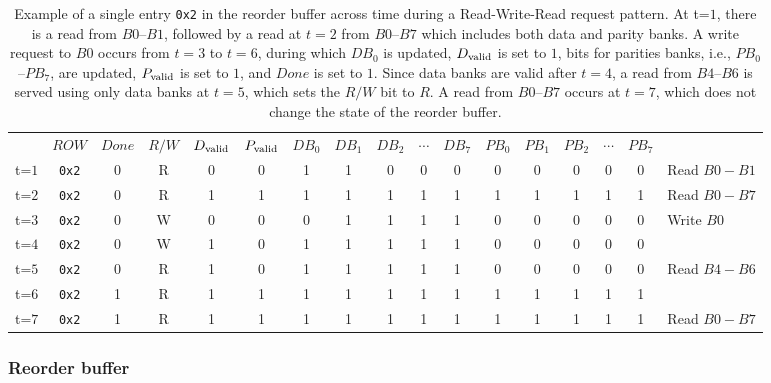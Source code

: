 \begin{table}[t!]
 \small
  \centering
  \begin{tabular}{c|c|c|c|c|c|c|c|c|c|c|c|c|c|c|c|l}
    \cline{2-16}
&    $ROW$ & $Done$ & $R/W$ & $D_{\rm valid}$ & $P_{\rm valid}$ & $DB_{0}$ &  $DB_{1}$ & $DB_{2}$ &$\cdots$ & $DB_7$  & $PB_0$ &  $PB_{1}$ & $PB_{2}$ & $\cdots$ & $PB_7$ \\
    \cline{2-16}
t=$1$ &   \texttt{0x2} & 0 & R  & 0 & 0  & 1 & 1 & 0 & 0 & 0 & 0 & 0  & 0 & 0& 0 & {\scriptsize Read $B0 - B1$}\\
    \cline{2-16}
t=$2$ &    \texttt{0x2} & 0 & R & 1 & 1 & 1 & 1 & 1 & 1& 1 & 1& 1 &1 &1&1& {\scriptsize Read $B0 - B7$}\\
   \cline{2-16}                          
t=$3$ &    \texttt{0x2} & 0 & W & 0 & 0 & 0 & 1 & 1 & 1& 1 & 0 & 0 & 0 & 0 & 0 & {\scriptsize Write $B0$} \\
   \cline{2-16}                          
t=$4$ &    \texttt{0x2} & 0 & W & 1 & 0 & 1 & 1 & 1 & 1& 1 & 0 & 0 & 0 & 0 & 0& \\
    \cline{2-16}   
t=$5$ &    \texttt{0x2} & 0 & R & 1 & 0 & 1 & 1 & 1 & 1& 1 & 0 & 0 & 0 & 0 & 0 & {\scriptsize Read $B4 - B6$}\\
    \cline{2-16} 
t=$6$ &    \texttt{0x2} & 1 & R & 1 & 1 & 1 & 1 & 1 & 1& 1 & 1 & 1 & 1 & 1 & 1 &\\
    \cline{2-16} 
t=$7$ &    \texttt{0x2} & 1 & R & 1 & 1 & 1 & 1 & 1 & 1& 1 & 1 & 1 & 1 & 1 & 1 &{\scriptsize Read $B0 - B7$} \\
    \cline{2-16}                                                     
  \end{tabular}
  \caption{Example of a single entry \texttt{0x2} in the reorder buffer across time during a Read-Write-Read request pattern. At t=$1$, there is a read from $B0$--$B1$, followed by a read at $t=2$ from $B0$--$B7$ which includes both data and parity banks. A write request to $B0$ occurs from $t=3$ to $t=6$, during which $DB_0$ is updated, $D_{\rm valid}$ is set to $1$, bits for parities banks, i.e., $PB_0$--$PB_7$, are updated, $P_{\rm valid}$ is set to $1$, and $Done$ is set to $1$. Since data banks are valid after $t=4$, a read from $B{4} $--$B6$ is served using only data banks at $t=5$, which sets the $R/W$ bit to $R$. A read from $B0 $--$B7$ occurs at $t=7$, which does not change the state of the reorder buffer. }
  \label{fig:rob}
\end{table}

\subsubsection{Reorder buffer}
\label{sec:reorder}

